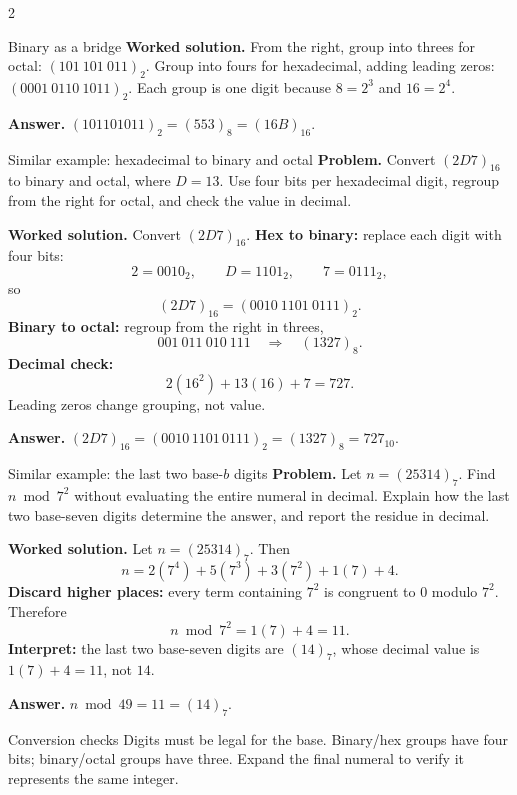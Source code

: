 \documentclass[10pt]{article}
\begin{document}
\begin{multicols}{2}
\begin{methodbox}{Binary as a bridge}
\textbf{Worked solution.} From the right, group into threes for octal: $(101\ 101\ 011)_2$. Group into fours for hexadecimal, adding leading zeros: $(0001\ 0110\ 1011)_2$. Each group is one digit because $8=2^3$ and $16=2^4$.

\textbf{Answer.} $(101101011)_2=(553)_8=(16B)_{16}$.
\end{methodbox}

\begin{workedbox}{Similar example: hexadecimal to binary and octal}
\textbf{Problem.} Convert $(2D7)_{16}$ to binary and octal, where $D=13$. Use four bits per hexadecimal digit, regroup from the right for octal, and check the value in decimal.

\textbf{Worked solution.} Convert $(2D7)_{16}$.
\textbf{Hex to binary:} replace each digit with four bits:
\[
2=0010_2,\qquad D=1101_2,\qquad7=0111_2,
\]
so
\[
(2D7)_{16}=(0010\ 1101\ 0111)_2.
\]
\textbf{Binary to octal:} regroup from the right in threes,
\[
001\ 011\ 010\ 111
\quad\Longrightarrow\quad (1327)_8.
\]
\textbf{Decimal check:}
\[
2(16^2)+13(16)+7=727.
\]
Leading zeros change grouping, not value.

\textbf{Answer.} $(2D7)_{16}=(0010\,1101\,0111)_2=(1327)_8=727_{10}$.
\end{workedbox}

\begin{workedbox}{Similar example: the last two base-$b$ digits}
\textbf{Problem.} Let $n=(25314)_7$. Find $n\bmod7^2$ without evaluating the entire numeral in decimal. Explain how the last two base-seven digits determine the answer, and report the residue in decimal.

\textbf{Worked solution.} Let $n=(25314)_7$. Then
\[
n=2(7^4)+5(7^3)+3(7^2)+1(7)+4.
\]
\textbf{Discard higher places:} every term containing $7^2$ is congruent to
$0$ modulo $7^2$. Therefore
\[
n\bmod7^2=1(7)+4=11.
\]
\textbf{Interpret:} the last two base-seven digits are $(14)_7$, whose decimal
value is $1(7)+4=11$, not $14$.

\textbf{Answer.} $n\bmod49=11=(14)_7$.
\end{workedbox}

\begin{checklistbox}{Conversion checks}
Digits must be legal for the base. Binary/hex groups have four bits; binary/octal
groups have three. Expand the final numeral to verify it represents the same
integer.
\end{checklistbox}
\end{multicols}
\endgroup
\end{document}
